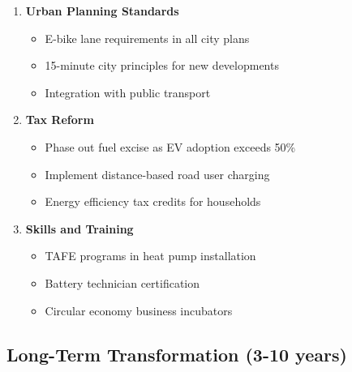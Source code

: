 \documentclass[12pt,a4paper]{article}
\begin{document}
\begin{enumerate}
    \item \textbf{Urban Planning Standards}
    \begin{itemize}
        \item E-bike lane requirements in all city plans
        \item 15-minute city principles for new developments
        \item Integration with public transport
    \end{itemize}
    
    \item \textbf{Tax Reform}
    \begin{itemize}
        \item Phase out fuel excise as EV adoption exceeds 50\%
        \item Implement distance-based road user charging
        \item Energy efficiency tax credits for households
    \end{itemize}
    
    \item \textbf{Skills and Training}
    \begin{itemize}
        \item TAFE programs in heat pump installation
        \item Battery technician certification
        \item Circular economy business incubators
    \end{itemize}
\end{enumerate}

\subsection{Long-Term Transformation (3-10 years)}
\end{document}
